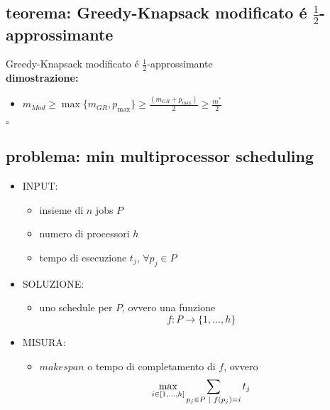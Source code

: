 
\subsection*{teorema: Greedy-Knapsack modificato \'e $\frac{1}{2}$-approssimante}
\begin{flushleft}
	Greedy-Knapsack modificato \'e $\frac{1}{2}$-approssimante \newline \\
	\vspace{0.5cm}
	\textbf{dimostrazione:}
	\begin{itemize}
		\item $m_{Mod}\geq\max\{m_{GR},p_{\max}\}\geq\frac{(m_{GR}+p_{\max})}{2}\geq\frac{m^*}{2}$
	\end{itemize}
	\hfill$\square$
\end{flushleft}


\subsection*{problema: min multiprocessor scheduling}
\begin{flushleft}
	\begin{itemize}
		\item INPUT:
		\begin{itemize}
			\item insieme di $n$ jobs $P$
			\item numero di processori $h$
			\item tempo di esecuzione $t_j$, $\forall p_j\in P$
		\end{itemize}
		\item SOLUZIONE:
		\begin{itemize}
			\item uno schedule per $P$, ovvero una funzione
				$$f:P\rightarrow\{1,\ldots,h\}$$
		\end{itemize}
		\item MISURA:
		\begin{itemize}
			\item $makespan$ o tempo di completamento di $f$, ovvero
				$$\max_{i\in[1,\ldots,h]}\sum_{p_j\in P\hspace{0.1cm}\vert\hspace{0.1cm}f(p_j)=i}t_j$$
		\end{itemize}
	\end{itemize}
\end{flushleft}

